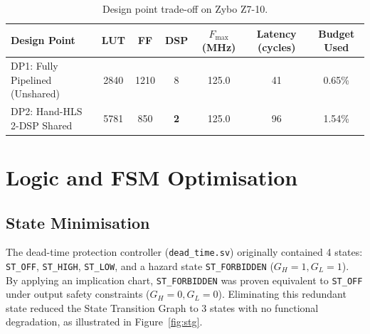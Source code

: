 \documentclass[11pt,a4paper]{article}
\begin{document}
\begin{table}[H]\centering\small
\caption{Design point trade-off on Zybo Z7-10.}\label{tab:designpoints}
\begin{tabular}{@{}lcccccc@{}}
\toprule
Design Point & LUT & FF & DSP & $F_\text{max}$ (MHz) & Latency (cycles) & Budget Used\\
\midrule
DP1: Fully Pipelined (Unshared) & 2840 & 1210 & 8 & 125.0 & 41 & 0.65\%\\
DP2: Hand-HLS 2-DSP Shared & 5781 & 850 & \textbf{2} & 125.0 & 96 & 1.54\%\\
\bottomrule
\end{tabular}
\end{table}

\section{Logic and FSM Optimisation}
\label{sec:logic}

\subsection{State Minimisation}
The dead-time protection controller (\texttt{dead\_time.sv}) originally contained 4 states: \texttt{ST\_OFF}, \texttt{ST\_HIGH}, \texttt{ST\_LOW}, and a hazard state \texttt{ST\_FORBIDDEN} ($G_H = 1, G_L = 1$). By applying an implication chart, \texttt{ST\_FORBIDDEN} was proven equivalent to \texttt{ST\_OFF} under output safety constraints ($G_H = 0, G_L = 0$). Eliminating this redundant state reduced the State Transition Graph to 3 states with no functional degradation, as illustrated in Figure~\ref{fig:stg}.
\end{document}
